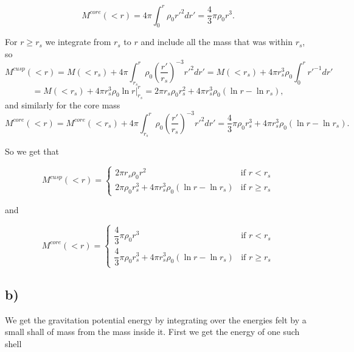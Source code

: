 \documentclass[a4paper,norsk, 10pt]{article}
\begin{document}
\begin{equation}
M^{core}(<r) = 4\pi \int_0^r \rho_0 r'^2 dr' = \dfrac{4}{3}\pi \rho_0 r^3. 
\end{equation}

For $r\geq r_s$ we integrate from $r_s$ to $r$ and include all the mass that was within $r_s$, so
\begin{equation}
M^{cusp}(<r) = M(<r_s) + 4\pi \int_{r_s}^r \rho_0\left(\dfrac{r'}{r_s}\right)^{-3} r'^2 dr' = M(<r_s) +  4\pi r_s^3 \rho_0 \int_0^r r'^{-1} dr'  
\end{equation}
\begin{equation}
= M(<r_s) +  4\pi r_s^3 \rho_0 \ln r \big|_{r_s}^r = 2\pi r_s \rho_0 r_s^2 + 4\pi r_s^3 \rho_0 (\ln r - \ln r_s),
\end{equation}
and similarly for the core mass
\begin{equation}
M^{core}(<r) = M^{core}(<r_s) + 4\pi \int_{r_s}^r \rho_0\left(\dfrac{r'}{r_s}\right)^{-3} r'^2 dr' = \dfrac{4}{3}\pi \rho_0 r_s^3 + 4\pi r_s^3 \rho_0 (\ln r - \ln r_s).
\end{equation}

So we get that

\begin{equation}
M^{cusp}(<r) =
\left\{
	\begin{array}{ll}
		2\pi r_s \rho_0 r^2  & \mbox{if } r < r_s \\
		2\pi  \rho_0 r_s^3 + 4\pi r_s^3 \rho_0 (\ln r - \ln r_s) & \mbox{if } r \geq r_s
	\end{array}
\right.
\end{equation}

and 

\begin{equation}
M^{core}(<r) =
\left\{
	\begin{array}{ll}
		\dfrac{4}{3}\pi \rho_0 r^3  & \mbox{if } r < r_s \\
		\dfrac{4}{3}\pi \rho_0 r_s^3 + 4\pi r_s^3 \rho_0 (\ln r - \ln r_s) & \mbox{if } r \geq r_s
	\end{array}
\right.
\end{equation}

\subsection{b)}

We get the gravitation potential energy by integrating over the energies felt by a small shall of mass from the mass inside it. First we get the energy of one such shell
\end{document}
